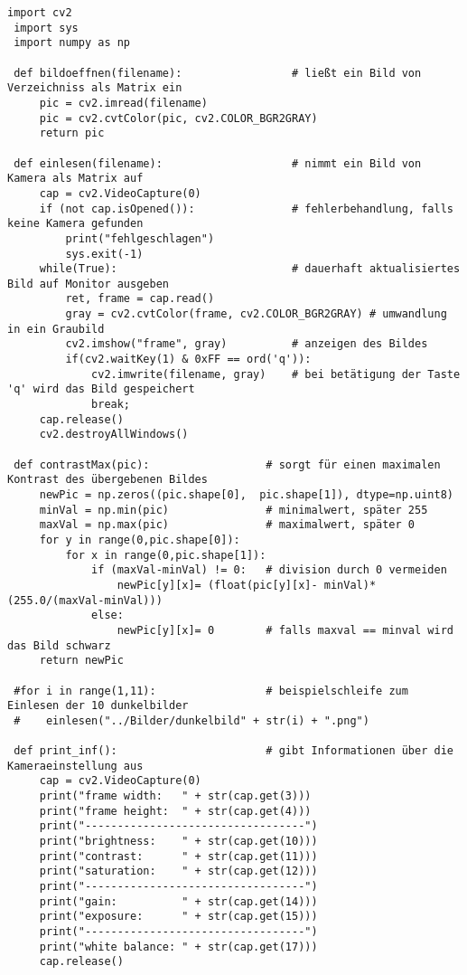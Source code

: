 \begin{lstlisting}[style=PYTHON,frame=single,
 caption=Zum einlesen der Bilder von Kamera oder Verzeichniss
 captionpos=b,
 label=lst:CVREAD] 
 import cv2
 import sys
 import numpy as np
 
 def bildoeffnen(filename):					# ließt ein Bild von Verzeichniss als Matrix ein
     pic = cv2.imread(filename)
     pic = cv2.cvtColor(pic, cv2.COLOR_BGR2GRAY)
     return pic
 
 def einlesen(filename):					# nimmt ein Bild von Kamera als Matrix auf
     cap = cv2.VideoCapture(0)
     if (not cap.isOpened()):				# fehlerbehandlung, falls keine Kamera gefunden
         print("fehlgeschlagen")
         sys.exit(-1)
     while(True):							# dauerhaft aktualisiertes Bild auf Monitor ausgeben
         ret, frame = cap.read()
         gray = cv2.cvtColor(frame, cv2.COLOR_BGR2GRAY)	# umwandlung in ein Graubild
         cv2.imshow("frame", gray)			# anzeigen des Bildes
         if(cv2.waitKey(1) & 0xFF == ord('q')):
             cv2.imwrite(filename, gray)	# bei betätigung der Taste 'q' wird das Bild gespeichert
             break;          
     cap.release()
     cv2.destroyAllWindows()
 
 def contrastMax(pic):					# sorgt für einen maximalen Kontrast des übergebenen Bildes
     newPic = np.zeros((pic.shape[0],  pic.shape[1]), dtype=np.uint8)
     minVal = np.min(pic)				# minimalwert, später 255
	 maxVal = np.max(pic)				# maximalwert, später 0
     for y in range(0,pic.shape[0]):
         for x in range(0,pic.shape[1]):
             if (maxVal-minVal) != 0:	# division durch 0 vermeiden
                 newPic[y][x]= (float(pic[y][x]- minVal)*(255.0/(maxVal-minVal)))
             else:
                 newPic[y][x]= 0		# falls maxval == minval wird das Bild schwarz
     return newPic
 
 #for i in range(1,11):					# beispielschleife zum Einlesen der 10 dunkelbilder
 #    einlesen("../Bilder/dunkelbild" + str(i) + ".png")
 
 def print_inf():						# gibt Informationen über die Kameraeinstellung aus
     cap = cv2.VideoCapture(0)
     print("frame width:   " + str(cap.get(3)))
     print("frame height:  " + str(cap.get(4)))
     print("----------------------------------")
     print("brightness:    " + str(cap.get(10)))
     print("contrast:      " + str(cap.get(11)))
     print("saturation:    " + str(cap.get(12)))
     print("----------------------------------")
     print("gain:          " + str(cap.get(14)))
     print("exposure:      " + str(cap.get(15)))
     print("----------------------------------")
     print("white balance: " + str(cap.get(17)))
     cap.release()

 \end{lstlisting}